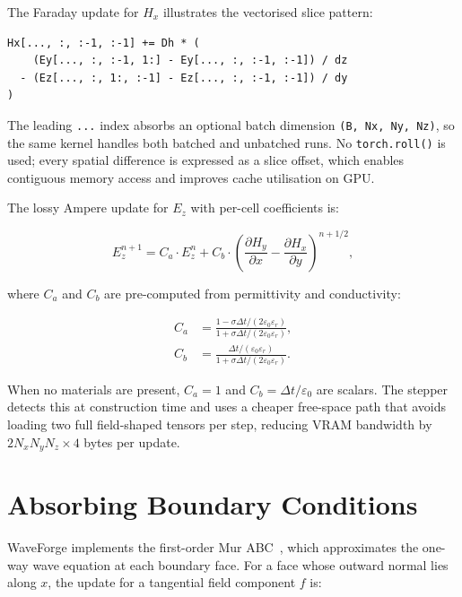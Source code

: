 \documentclass[10pt,twocolumn]{article}
\begin{document}
The Faraday update for $H_x$ illustrates the vectorised slice pattern:

\begin{lstlisting}[caption={Hx Faraday update — vectorised slice addition}]
Hx[..., :, :-1, :-1] += Dh * (
    (Ey[..., :, :-1, 1:] - Ey[..., :, :-1, :-1]) / dz
  - (Ez[..., :, 1:, :-1] - Ez[..., :, :-1, :-1]) / dy
)
\end{lstlisting}

The leading \texttt{...} index absorbs an optional batch dimension
\texttt{(B, Nx, Ny, Nz)}, so the same kernel handles both batched and
unbatched runs. No \texttt{torch.roll()} is used; every spatial difference is
expressed as a slice offset, which enables contiguous memory access and
improves cache utilisation on GPU.

The lossy Ampere update for $E_z$ with per-cell coefficients is:

\begin{equation}
  E_z^{n+1} = C_a \cdot E_z^n + C_b \cdot
  \left(\frac{\partial H_y}{\partial x} - \frac{\partial H_x}{\partial y}\right)^{n+1/2},
  \label{eq:ampere_lossy}
\end{equation}

where $C_a$ and $C_b$ are pre-computed from permittivity and conductivity:

\begin{align}
  C_a &= \frac{1 - \sigma\Delta t / (2\varepsilon_0\varepsilon_r)}
              {1 + \sigma\Delta t / (2\varepsilon_0\varepsilon_r)}, \\
  C_b &= \frac{\Delta t / (\varepsilon_0\varepsilon_r)}
              {1 + \sigma\Delta t / (2\varepsilon_0\varepsilon_r)}.
\end{align}

When no materials are present, $C_a = 1$ and $C_b = \Delta t / \varepsilon_0$
are scalars. The stepper detects this at construction time and uses a cheaper
free-space path that avoids loading two full field-shaped tensors per step,
reducing VRAM bandwidth by $2 N_x N_y N_z \times 4$ bytes per update.

\section{Absorbing Boundary Conditions}
\label{sec:boundaries}

WaveForge implements the first-order Mur ABC~\cite{mur1981absorbing}, which
approximates the one-way wave equation at each boundary face. For a face
whose outward normal lies along $x$, the update for a tangential field
component $f$ is:
\end{document}
